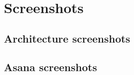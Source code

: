 \chapter{Screenshots}
\label{appendix5-screenshots}

\section*{Architecture screenshots}

\section*{Asana screenshots}

